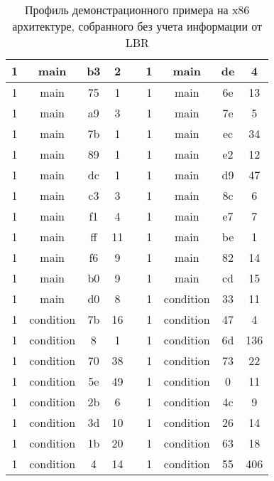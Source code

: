 \begin{table} [!h]%
    \centering
    \begin{threeparttable}%
        \caption{Профиль демонстрационного примера на x86 архитектуре, собранного без учета информации от LBR}%
        \label{tab:X86noLBR}%
        \begin{SingleSpace}
            \begin{tabular}{| c | c | c | c | c | c | c | c | c |}
            \hline
			1& main&      b3& 2 & &
			1& main&      de& 4 \\ \hline
			1& main&      75& 1 & &
			1& main&      6e& 13 \\ \hline
			1& main&      a9& 3 & &
			1& main&      7e& 5 \\ \hline
			1& main&      7b& 1 & &
			1& main&      ec& 34 \\ \hline
			1& main&      89& 1 & &
			1& main&      e2& 12 \\ \hline
			1& main&      dc& 1 & &
			1& main&      d9& 47 \\ \hline
			1& main&      c3& 3 & &
			1& main&      8c& 6 \\ \hline
			1& main&      f1& 4 & &
			1& main&      e7& 7 \\ \hline
			1& main&      ff& 11 & &
			1& main&      be& 1 \\ \hline
			1& main&      f6& 9 & &
			1& main&      82& 14 \\ \hline
			1& main&      b0& 9 & &
			1& main&      cd& 15 \\ \hline
			1& main&      d0& 8 & &
			1& condition& 33& 11 \\ \hline
			1& condition& 7b& 16 & &
			1& condition& 47& 4 \\ \hline
			1& condition& 8&  1 & &
			1& condition& 6d& 136 \\ \hline
			1& condition& 70& 38 & &
			1& condition& 73& 22 \\ \hline
			1& condition& 5e& 49 & &
			1& condition& 0 & 11 \\ \hline
			1& condition& 2b& 6 & &
			1& condition& 4c& 9 \\ \hline
			1& condition& 3d& 10 & &
			1& condition& 26& 14 \\ \hline
			1& condition& 1b& 20 & &
			1& condition& 63& 18 \\ \hline
			1& condition& 4 & 14 & &
			1& condition& 55& 406 \\ \hline

\end{tabular}
\end{SingleSpace}
\end{threeparttable}
\end{table}
